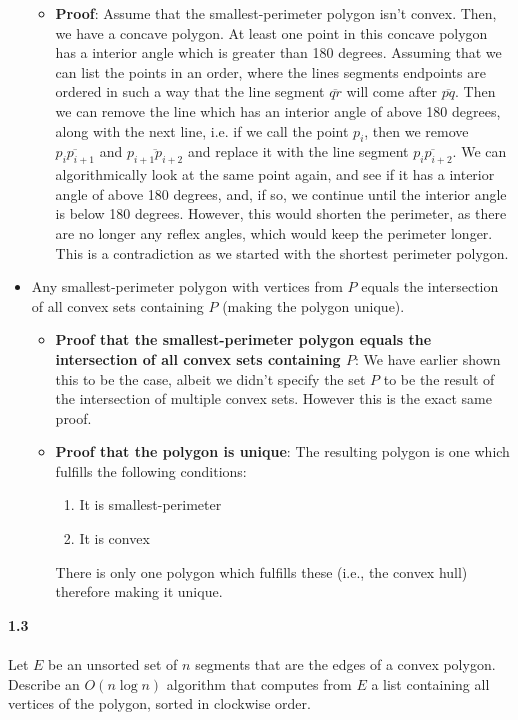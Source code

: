 \begin{itemize}
\begin{itemize}
		      \item \textbf{Proof}:
		            Assume that the smallest-perimeter polygon isn't convex. Then, we have a concave polygon. At least one point in this concave polygon has a interior angle which is greater than 180 degrees. Assuming that we can list the points in an order, where the lines segments endpoints are ordered in such a way that the line segment $\overline{qr}$ will come after $\overline{pq}$. Then we can remove the line which has an interior angle of above 180 degrees, along with the next line, i.e. if we call the point $p_{i}$, then we remove $\overline{p_{i}p_{i+1}}$ and $\overline{p_{i+1}p_{i+2}}$ and replace it with the line segment $\overline{p_{i}p_{i+2}}$. We can algorithmically look at the same point again, and see if it has a interior angle of above 180 degrees, and, if so, we continue until the interior angle is below 180 degrees. However, this would shorten the perimeter, as there are no longer any reflex angles, which would keep the perimeter longer. This is a contradiction as we started with the shortest perimeter polygon.
	      \end{itemize}
	\item Any smallest-perimeter polygon with vertices from $P$ equals the intersection of all convex sets containing $P$ (making the polygon unique).
	      \begin{itemize}
		      \item \textbf{Proof that the smallest-perimeter polygon equals the intersection of all convex sets containing $P$}: We have earlier shown this to be the case, albeit we didn't specify the set $P$ to be the result of the intersection of multiple convex sets. However this is the exact same proof.
		      \item \textbf{Proof that the polygon is unique}: The resulting polygon is one which fulfills the following conditions:
		            \begin{enumerate}
			            \item It is smallest-perimeter
			            \item It is convex
		            \end{enumerate}
		            There is only one polygon which fulfills these (i.e., the convex hull) therefore making it unique.
	      \end{itemize}
\end{itemize}

\noindent
\textbf{1.3}\\\\
\noindent
Let $E$ be an unsorted set of $n$ segments that are the edges of a convex polygon. Describe an $O(n \log n)$ algorithm that computes from $E$ a list containing all vertices of the polygon, sorted in clockwise order.

